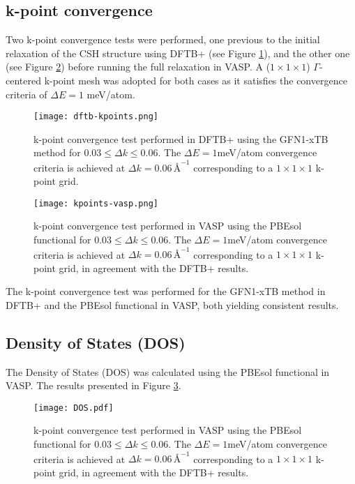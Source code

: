 \subsection{k-point convergence}
 Two k-point convergence tests were performed, one previous to the initial relaxation of the CSH structure using DFTB+ (see Figure \ref{dftb-kpoints}), and the other one (see Figure \ref{kpoints-vasp}) before running the full relaxation in VASP. A ($1\times 1\times 1$) $\Gamma$-centered k-point mesh was adopted for both cases as it satisfies the convergence criteria of $\Delta E= 1$ meV/atom. 
\begin{figure}[H]
    \centering
    \texttt{[image: dftb-kpoints.png]}
    \caption{k-point convergence test performed in DFTB+ using the GFN1-xTB method for $0.03 \leq \Delta k \leq 0.06$. The 
    $\Delta E = 1$meV/atom convergence criteria is achieved at $\Delta k = 0.06 \,\text{\AA}^{-1}$ corresponding to a $1\times 1\times 1$ k-point grid. 
    }
    \label{dftb-kpoints}
\end{figure}

\begin{figure}[H]
    \centering
    \texttt{[image: kpoints-vasp.png]}
    \caption{k-point convergence test performed in VASP using the PBEsol functional for $0.03 \leq \Delta k \leq 0.06$. The $\Delta E = 1$meV/atom convergence criteria is achieved at $\Delta k = 0.06 \,\text{\AA}^{-1}$ corresponding to a $1\times 1\times 1$ k-point grid, in agreement with the DFTB+ results.
    }
    \label{kpoints-vasp}
\end{figure}
The k-point convergence test was performed for the GFN1-xTB method in DFTB+ and the PBEsol functional in VASP, both yielding consistent results. 

\subsection{Density of States (DOS)}
The Density of States (DOS) was calculated using the PBEsol functional in VASP. The results presented in Figure \ref{dos}. 
\begin{figure}[H]
    \centering
    \texttt{[image: DOS.pdf]}
    \caption{k-point convergence test performed in VASP using the PBEsol functional for $0.03 \leq \Delta k \leq 0.06$. The $\Delta E = 1$meV/atom convergence criteria is achieved at $\Delta k = 0.06 \,\text{\AA}^{-1}$ corresponding to a $1\times 1\times 1$ k-point grid, in agreement with the DFTB+ results.
    }
    \label{dos}
\end{figure}

